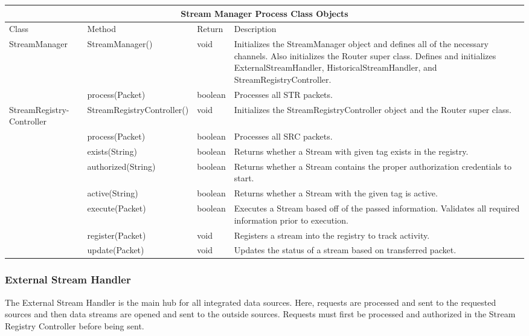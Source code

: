 \documentclass{article}
\begin{document}
\begin{flushleft}
\begin{center}
\begin{tabular}{ | p{3cm} || p{4cm} | p{2cm} | p{6cm} | }
\hline
\multicolumn{4}{|c|}{Stream Manager Process Class Objects}\\
\hline
Class & Method & Return & Description\\
\hline
StreamManager & StreamManager() & void & Initializes the StreamManager object and defines all of the necessary channels. Also initializes the Router super class. Defines and initializes ExternalStreamHandler, HistoricalStreamHandler, and StreamRegistryController.\\
 & process(Packet) & boolean & Processes all STR packets.\\
\hline
StreamRegistry-Controller & StreamRegistryController() & void & Initializes the StreamRegistryController object and the Router super class.\\
 & process(Packet) & boolean & Processes all SRC packets.\\
 & exists(String) & boolean & Returns whether a Stream with given tag exists in the registry.\\
 & authorized(String) & boolean & Returns whether a Stream contains the proper authorization credentials to start.\\
 & active(String) & boolean & Returns whether a Stream with the given tag is active.\\
 & execute(Packet) & boolean & Executes a Stream based off of the passed information. Validates all required information prior to execution.\\
 & register(Packet) & void & Registers a stream into the registry to track activity.\\
 & update(Packet) & void & Updates the status of a stream based on transferred packet.\\
\hline

\end{tabular}
\end{center}
\end{flushleft}

\cleardoublepage
\subsubsection{External Stream Handler}
The External Stream Handler is the main hub for all integrated data sources. Here, requests are processed and sent to the requested sources and then data streams are opened and sent to the outside sources. Requests must first be processed and authorized in the Stream Registry Controller before being sent.
\end{document}
